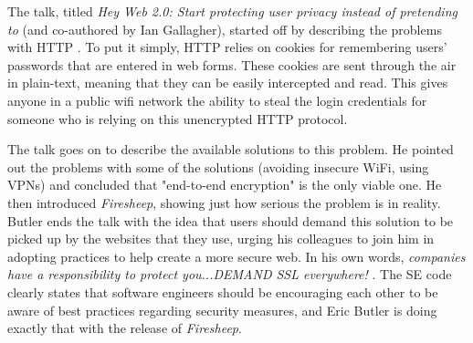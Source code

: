 \documentclass[11pt]{article}
\begin{document}
\begin{multicols}{2}
The talk, titled \emph{Hey Web 2.0: Start protecting user privacy instead of pretending to} (and co-authored by Ian Gallagher), started off by describing the problems with HTTP \cite{toorcon_slides}. To put it simply, HTTP relies on cookies for remembering users' passwords that are entered in web forms. These cookies are sent through the air in plain-text, meaning that they can be easily intercepted and read. This gives anyone in a public wifi network the ability to steal the login credentials for someone who is relying on this unencrypted HTTP protocol.

The talk goes on to describe the available solutions to this problem. He pointed out the problems with some of the solutions (avoiding insecure WiFi, using VPNs) and concluded that "end-to-end encryption" is the only viable one. He then introduced \emph{Firesheep}, showing just how serious the problem is in reality. Butler ends the talk with the idea that users should demand this solution to be picked up by the websites that they use, urging his colleagues to join him in adopting practices to help create a more secure web. In his own words, \emph{companies have a responsibility to protect you...DEMAND SSL everywhere!} \cite{toorcon_slides}. The SE code clearly states that software engineers should be encouraging each other to be aware of best practices regarding security measures, and Eric Butler is doing exactly that with the release of \emph{Firesheep}.

%  


\end{multicols}
\end{document}
